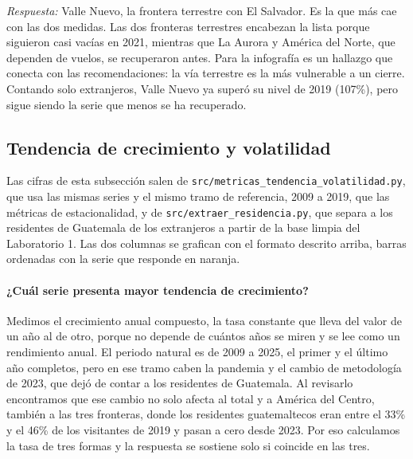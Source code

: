 \emph{Respuesta:} Valle Nuevo, la frontera terrestre con El Salvador. Es la que
más cae con las dos medidas. Las dos fronteras terrestres encabezan la lista
porque siguieron casi vacías en 2021, mientras que La Aurora y América del Norte,
que dependen de vuelos, se recuperaron antes. Para la infografía es un hallazgo
que conecta con las recomendaciones: la vía terrestre es la más vulnerable a un
cierre. Contando solo extranjeros, Valle Nuevo ya superó su nivel de 2019 (107\%),
pero sigue siendo la serie que menos se ha recuperado.

\subsection{Tendencia de crecimiento y volatilidad}


Las cifras de esta subsección salen de \texttt{src/metricas\_tendencia\_volatilidad.py}, que
usa las mismas series y el mismo tramo de referencia, 2009 a 2019, que las métricas de
estacionalidad, y de \texttt{src/extraer\_residencia.py}, que separa a los residentes de
Guatemala de los extranjeros a partir de la base limpia del Laboratorio 1. Las dos columnas se
grafican con el formato descrito arriba, barras ordenadas con la serie que responde en naranja.

\paragraph{¿Cuál serie presenta mayor tendencia de crecimiento?} Medimos el crecimiento anual
compuesto, la tasa constante que lleva del valor de un año al de otro, porque no depende de
cuántos años se miren y se lee como un rendimiento anual. El periodo natural es de 2009 a 2025,
el primer y el último año completos, pero en ese tramo caben la pandemia y el cambio de
metodología de 2023, que dejó de contar a los residentes de Guatemala. Al revisarlo encontramos
que ese cambio no solo afecta al total y a América del Centro, también a las tres fronteras,
donde los residentes guatemaltecos eran entre el 33\% y el 46\% de los visitantes de 2019 y pasan
a cero desde 2023. Por eso calculamos la tasa de tres formas y la respuesta se sostiene solo si
coincide en las tres.


